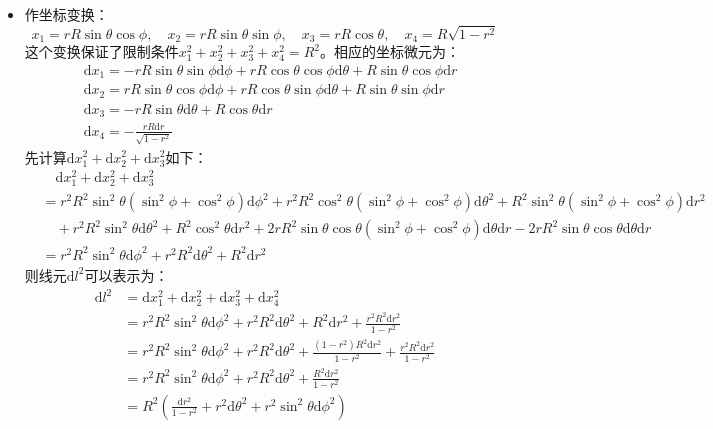 \documentclass[a4paper,fontset=none]{ctexart}
\begin{document}
\begin{itemize}

\item[1.]

作坐标变换：
\[
x_1 = rR\sin\theta\cos\phi,\quad x_2 = rR\sin\theta\sin\phi,\quad x_3 = rR\cos\theta,\quad x_4 = R\sqrt{1-r^2}
\]
这个变换保证了限制条件$x_1^2+x_2^2+x_3^2+x_4^2=R^2$。相应的坐标微元为：
\begin{align*}
& \mathrm{d}x_1 = -rR\sin\theta\sin\phi\mathrm{d}\phi + rR\cos\theta\cos\phi\mathrm{d}\theta + R\sin\theta\cos\phi\mathrm{d}r \\
& \mathrm{d}x_2 = rR\sin\theta\cos\phi\mathrm{d}\phi + rR\cos\theta\sin\phi\mathrm{d}\theta + R\sin\theta\sin\phi\mathrm{d}r \\
& \mathrm{d}x_3 = -rR\sin\theta\mathrm{d}\theta + R\cos\theta\mathrm{d}r \\
& \mathrm{d}x_4 = -\frac{rR\mathrm{d}r}{\sqrt{1-r^2}}
\end{align*}
先计算$\mathrm{d}x_1^2 + \mathrm{d}x_2^2 + \mathrm{d}x_3^2$如下：
\begin{align*}
    &\quad \mathrm{d}x_1^2 + \mathrm{d}x_2^2 + \mathrm{d}x_3^2 \\
    &= r^2 R^2\sin^2\theta(\sin^2\phi+\cos^2\phi)\mathrm{d}\phi^2 + r^2 R^2\cos^2\theta(\sin^2\phi+\cos^2\phi)\mathrm{d}\theta^2 +  R^2\sin^2\theta(\sin^2\phi+\cos^2\phi)\mathrm{d}r^2 \\
    &\quad + r^2 R^2\sin^2\theta\mathrm{d}\theta^2 + R^2\cos^2\theta\mathrm{d}r^2 + 2rR^2\sin\theta\cos\theta(\sin^2\phi+\cos^2\phi)\mathrm{d}\theta\mathrm{d}r - 2rR^2\sin\theta\cos\theta\mathrm{d}\theta\mathrm{d}r \\
    &= r^2 R^2\sin^2\theta\mathrm{d}\phi^2 + r^2 R^2\mathrm{d}\theta^2 + R^2\mathrm{d}r^2
\end{align*}
则线元$\mathrm{d}l^2$可以表示为：
\begin{align*}
\mathrm{d}l^2
&= \mathrm{d}x_1^2 + \mathrm{d}x_2^2 + \mathrm{d}x_3^2 + \mathrm{d}x_4^2 \\
&= r^2 R^2\sin^2\theta\mathrm{d}\phi^2 + r^2 R^2\mathrm{d}\theta^2 + R^2\mathrm{d}r^2 + \frac{r^2 R^2\mathrm{d}r^2}{1-r^2} \\
&= r^2 R^2\sin^2\theta\mathrm{d}\phi^2 + r^2 R^2\mathrm{d}\theta^2 + \frac{(1-r^2)R^2\mathrm{d}r^2}{1-r^2} + \frac{r^2 R^2\mathrm{d}r^2}{1-r^2} \\
&= r^2 R^2\sin^2\theta\mathrm{d}\phi^2 + r^2 R^2\mathrm{d}\theta^2 + \frac{R^2\mathrm{d}r^2}{1-r^2} \\
&= R^2\left(\frac{\mathrm{d}r^2}{1-r^2} + r^2\mathrm{d}\theta^2 + r^2\sin^2\theta\mathrm{d}\phi^2\right)
\end{align*}


\end{itemize}
\end{document}
